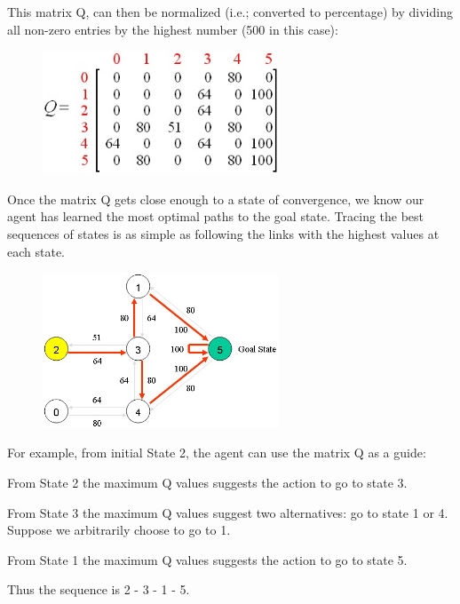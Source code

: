 \documentclass[a4paper, 11pt]{article}
\begin{document}
This matrix Q, can then be normalized (i.e.; converted to percentage) by dividing all non-zero entries by the highest number (500 in this case):

\begin{figure}[ht]
\centering
\includegraphics[width=7cm]{Pic/q_matrix5}
\end{figure}

Once the matrix Q gets close enough to a state of convergence, we know our agent has learned the most optimal paths to the goal state.  Tracing the best sequences of states is as simple as following the links with the highest values at each state.

\begin{figure}[ht]
\centering
\includegraphics[width=7cm]{Pic/map5}
\end{figure}

For example, from initial State 2, the agent can use the matrix Q as a guide:

From State 2 the maximum Q values suggests the action to go to state 3.

From State 3 the maximum Q values suggest two alternatives: go to state 1 or 4.  Suppose we arbitrarily choose  to go to 1.

From State 1 the maximum Q values suggests the action to go to state 5.

Thus the sequence is 2 - 3 - 1 - 5.
\end{document}
